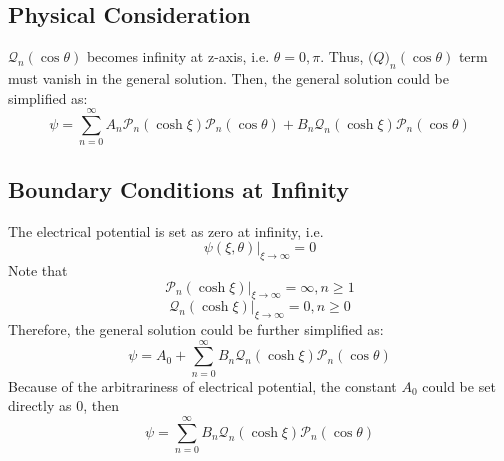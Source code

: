 \documentclass[fontsize=11pt, %
                             paper=a4, %
                             twoside, %
                             captions=tableheading,
                             index=totoc,
                             hyperref]{labbook}
\begin{document}
\begin{addmargin}[4cm]{0cm}
\subsection{Physical Consideration}
$\mathscr{Q}_n(\cos\theta)$ becomes infinity at z-axis, i.e. $\theta=0, \pi$. Thus, $\mathscr(Q)_n(\cos\theta)$ term must vanish in the general solution. Then, the general solution could be simplified as:
\begin{equation}
\psi=\sum_{n=0}^\infty A_n \mathscr{P}_n(\cosh\xi)\mathscr{P}_n(\cos\theta)+B_n\mathscr{Q}_n(\cosh\xi)\mathscr{P}_n(\cos\theta)
\end{equation}
\subsection{Boundary Conditions at Infinity}
The electrical potential is set as zero at infinity, i.e.
\begin{equation}
\psi(\xi,\theta)|_{\xi\rightarrow\infty}=0
\end{equation}
Note that
\begin{equation}
\mathscr{P}_n(\cosh\xi)|_{\xi\rightarrow\infty}=\infty, n\ge1
\end{equation}
\begin{equation}
\mathscr{Q}_n(\cosh\xi)|_{\xi\rightarrow\infty}=0,n\ge0
\end{equation}
Therefore, the general solution could be further simplified as:
\begin{equation}
\psi=A_0+\sum_{n=0}^\infty B_n \mathscr{Q}_n(\cosh\xi)\mathscr{P}_n(\cos\theta)
\end{equation}
Because of the arbitrariness of electrical potential, the constant $A_0$ could be set directly as 0, then
\begin{equation}
\psi=\sum_{n=0}^\infty B_n \mathscr{Q}_n(\cosh\xi)\mathscr{P}_n(\cos\theta)
\end{equation}

\end{addmargin}
\end{document}
